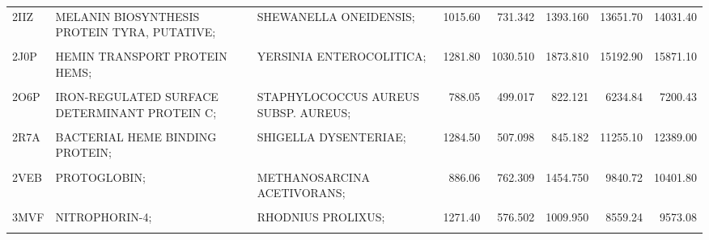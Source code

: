 \begin{table}
{\begin{tabular}{lllrrrrr}
				2IIZ & MELANIN BIOSYNTHESIS PROTEIN TYRA, PUTATIVE; & SHEWANELLA ONEIDENSIS; & 1015.60 & 731.342 & 1393.160 & 13651.70 & 14031.40\\
				\cellcolor{gray!6}{2IPS} & \cellcolor{gray!6}{LACTOPEROXIDASE;} & \cellcolor{gray!6}{BOS TAURUS;} & \cellcolor{gray!6}{1242.40} & \cellcolor{gray!6}{618.252} & \cellcolor{gray!6}{1075.560} & \cellcolor{gray!6}{27760.50} & \cellcolor{gray!6}{25814.10}\\
				2J0P & HEMIN TRANSPORT PROTEIN HEMS; & YERSINIA ENTEROCOLITICA; & 1281.80 & 1030.510 & 1873.810 & 15192.90 & 15871.10\\
				\cellcolor{gray!6}{2J18} & \cellcolor{gray!6}{CHLOROPEROXIDASE;} & \cellcolor{gray!6}{CALDARIOMYCES FUMAGO;} & \cellcolor{gray!6}{841.67} & \cellcolor{gray!6}{1962.990} & \cellcolor{gray!6}{3556.340} & \cellcolor{gray!6}{12675.10} & \cellcolor{gray!6}{12779.00}\\
				\addlinespace
				2O6P & IRON-REGULATED SURFACE DETERMINANT PROTEIN C; & STAPHYLOCOCCUS AUREUS SUBSP. AUREUS; & 788.05 & 499.017 & 822.121 & 6234.84 & 7200.43\\
				\cellcolor{gray!6}{2Q6N} & \cellcolor{gray!6}{CYTOCHROME P450 2B4;} & \cellcolor{gray!6}{ORYCTOLAGUS CUNICULUS;} & \cellcolor{gray!6}{1030.10} & \cellcolor{gray!6}{644.365} & \cellcolor{gray!6}{1040.080} & \cellcolor{gray!6}{20051.10} & \cellcolor{gray!6}{19747.50}\\
				2R7A & BACTERIAL HEME BINDING PROTEIN; & SHIGELLA DYSENTERIAE; & 1284.50 & 507.098 & 845.182 & 11255.10 & 12389.00\\
				\cellcolor{gray!6}{2SPL} & \cellcolor{gray!6}{MYOGLOBIN;} & \cellcolor{gray!6}{PHYSETER CATODON;} & \cellcolor{gray!6}{1055.70} & \cellcolor{gray!6}{589.706} & \cellcolor{gray!6}{1029.660} & \cellcolor{gray!6}{7588.36} & \cellcolor{gray!6}{8105.94}\\
				2VEB & PROTOGLOBIN; & METHANOSARCINA ACETIVORANS; & 886.06 & 762.309 & 1454.750 & 9840.72 & 10401.80\\
				\addlinespace
				\cellcolor{gray!6}{3HX9} & \cellcolor{gray!6}{PROTEIN RV3592;} & \cellcolor{gray!6}{MYCOBACTERIUM TUBERCULOSIS;} & \cellcolor{gray!6}{1844.50} & \cellcolor{gray!6}{785.442} & \cellcolor{gray!6}{1168.200} & \cellcolor{gray!6}{5819.08} & \cellcolor{gray!6}{7189.03}\\
				3MVF & NITROPHORIN-4; & RHODNIUS PROLIXUS; & 1271.40 & 576.502 & 1009.950 & 8559.24 & 9573.08\\
				\cellcolor{gray!6}{3QZN} & \cellcolor{gray!6}{IRON-REGULATED SURFACE DETERMINANT PROTEIN A;} & \cellcolor{gray!6}{STAPHYLOCOCCUS AUREUS SUBSP. AUREUS;} & \cellcolor{gray!6}{726.52} & \cellcolor{gray!6}{664.858} & \cellcolor{gray!6}{1221.330} & \cellcolor{gray!6}{6133.24} & \cellcolor{gray!6}{7179.49}\\

\end{tabular}}
\end{table}
